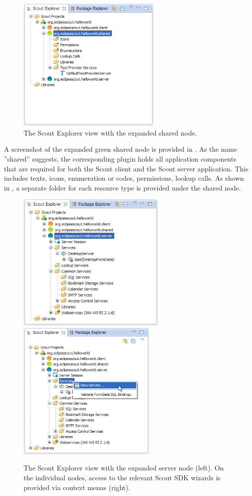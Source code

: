 \documentclass[a4paper,10pt,twoside]{book}
\begin{document}
\begin{figure}
\includegraphics[width=7cm]{explorer_shared.png} 
\caption{The Scout Explorer view with the expanded shared node.}
\end{figure}

A screenshot of the expanded green shared node  is provided in . 
As the name ''shared'' suggests, the corresponding plugin holds all application components that are required for both the Scout client and the Scout server application. 
This includes texts, icons, enumeration or codes, permissions, lookup calls. 
As shown in , a separate folder for each resource type is provided under the shared node.
 
\begin{figure}
\includegraphics[height=6.8cm]{explorer_server.png} \hspace{5mm} 
\includegraphics[height=6.8cm]{explorer_server_servicewizard.png}
\caption{The Scout Explorer view with the expanded server node (left). On the individual nodes, access to the relevant Scout SDK wizards is provided via context menus (right).}
\end{figure}
\end{document}
